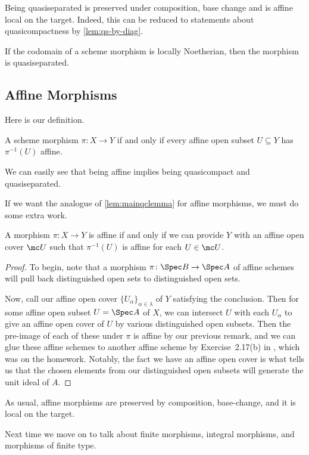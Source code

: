\documentclass[../notes.tex]{subfiles}
\begin{document}
\begin{remark}
	Being quasiseparated is preserved under composition, base change and is affine local on the target. Indeed, this can be reduced to statements about quasicompactness by \autoref{lem:qs-by-diag}.
\end{remark}
\begin{remark}
	If the codomain of a scheme morphism is locally Noetherian, then the morphism is quasiseparated.
\end{remark}

\subsection{Affine Morphisms}
Here is our definition.
\begin{definition}[Affine]
	A scheme morphism $\pi\colon X\to Y$ if and only if every affine open subset $U\subseteq Y$ has $\pi^{-1}(U)$ affine.
\end{definition}
\begin{remark}
	We can easily see that being affine implies being quasicompact and quasiseparated.
\end{remark}
If we want the analogue of \autoref{lem:mainqclemma} for affine morphisms, we must do some extra work.
\begin{lemma}
	A morphism $\pi\colon X\to Y$ is affine if and only if we can provide $Y$ with an affine open cover $\mc U$ such that $\pi^{-1}(U)$ is affine for each $U\in\mc U$.
\end{lemma}
\begin{proof}
	To begin, note that a morphism $\pi\colon\Spec B\to\Spec A$ of affine schemes will pull back distinguished open sets to distinguished open sets.

	Now, call our affine open cover $\{U_\alpha\}_{\alpha\in\lambda}$ of $Y$ satisfying the conclusion. Then for some affine open subset $U=\Spec A$ of $X$, we can intersect $U$ with each $U_\alpha$ to give an affine open cover of $U$ by various distinguished open subsets. Then the pre-image of each of these under $\pi$ is affine by our previous remark, and we can glue these affine schemes to another affine scheme by Exercise~2.17(b) in \cite{hartshorne}, which was on the homework. Notably, the fact we have an affine open cover is what tells us that the chosen elements from our distinguished open subsets will generate the unit ideal of $A$.
\end{proof}
\begin{remark}
	As usual, affine morphisms are preserved by composition, base-change, and it is local on the target.
\end{remark}
Next time we move on to talk about finite morphisms, integral morphisms, and morphisms of finite type.
\end{document}
